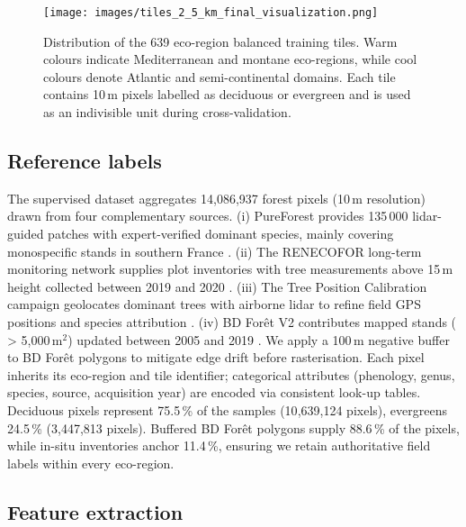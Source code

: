 \documentclass[utf8]{FrontiersinHarvard}
\begin{document}
\begin{figure}[H]
    \centering
    \texttt{[image: images/tiles\_2\_5\_km\_final\_visualization.png]}
    \caption{Distribution of the 639 eco-region balanced training tiles. Warm colours indicate Mediterranean and montane eco-regions, while cool colours denote Atlantic and semi-continental domains. Each tile contains 10\,m pixels labelled as deciduous or evergreen and is used as an indivisible unit during cross-validation.}
    \label{fig:training_tiles}
\end{figure}

\subsection{Reference labels}
The supervised dataset aggregates 14{,}086{,}937 forest pixels (10\,m resolution) drawn from four complementary sources. (i) PureForest provides 135\,000 lidar-guided patches with expert-verified dominant species, mainly covering monospecific stands in southern France \citep{gaydon2024pureforestlargescaleaeriallidar}. (ii) The RENECOFOR long-term monitoring network supplies plot inventories with tree measurements above 15\,m height collected between 2019 and 2020 \citep{ulrich:hal-03444393}. (iii) The Tree Position Calibration campaign geolocates dominant trees with airborne lidar to refine field GPS positions and species attribution \citep{ONF,IGN_LiDARHD}. (iv) BD Forêt V2 contributes mapped stands ( > 5{,}000\,m$^2$) updated between 2005 and 2019 \citep{IGN2024}. We apply a 100\,m negative buffer to BD Forêt polygons to mitigate edge drift before rasterisation. Each pixel inherits its eco-region and tile identifier; categorical attributes (phenology, genus, species, source, acquisition year) are encoded via consistent look-up tables. Deciduous pixels represent 75.5\,\% of the samples (10{,}639{,}124 pixels), evergreens 24.5\,\% (3{,}447{,}813 pixels). Buffered BD Forêt polygons supply 88.6\,\% of the pixels, while in-situ inventories anchor 11.4\,\%, ensuring we retain authoritative field labels within every eco-region.

\subsection{Feature extraction}
\end{document}
